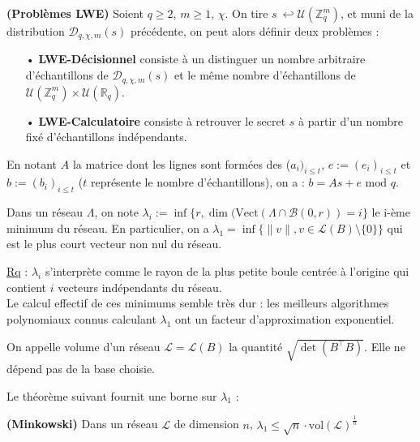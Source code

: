 \documentclass[11pt,a4paper]{article}
\begin{document}
\begin{defin}\textbf{(Problèmes LWE)}
Soient $q\geq 2$, $m\geq 1$, $\chi$. On tire $s\ \hookleftarrow \mathcal{U}( \mathbb{Z}_q^m)$, et muni de la distribution $\mathcal{D}_{q,\chi,m}(s)$ précédente, on peut alors définir deux problèmes : 
\begin{enumerate}
\item[•]\textbf{LWE-Décisionnel} consiste à un distinguer un nombre arbitraire d'échantillons de $\mathcal{D}_{q,\chi,m}(s)$ et le même nombre d'échantillons de $\mathcal{U}(\mathbb{Z}_q^m)\times\mathcal{U}(\mathbb{R}_q)$.
\item[•]\textbf{LWE-Calculatoire} consiste à retrouver le secret $s$ à partir d'un nombre fixé d'échantillons indépendants.
\end{enumerate}
\end{defin}

En notant $A$ la matrice dont les lignes sont formées des ($a_i)_{i\leq t}$, $e:=(e_i)_{i\leq t}$ et $b:=(b_i)_{i\leq t}$ ($t$ représente le nombre d'échantillons), on a : $b=As +e \text{ mod } q$.

\begin{defin}
Dans un réseau $\Lambda$, on note $\lambda_i := \inf\{r,\dim(\text{Vect}(\Lambda\cap\mathcal{B}(0,r))=i\}$ le i-ème minimum du réseau. En particulier, on a $\lambda_1 = \inf\{\|v\| ,  v \in \mathcal{L}(B)\setminus\{0\}\}$ qui est le plus court vecteur non nul du réseau.
\end{defin}

\underline{Rq} : $\lambda_i$ s'interprète comme le rayon de la plus petite boule centrée à l'origine qui contient $i$ vecteurs indépendants du réseau. \\ Le calcul effectif de ces minimums semble très dur : les meilleurs algorithmes polynomiaux connus calculant $\lambda_1$ ont un facteur d'approximation exponentiel. \\

\begin{defin}
 On appelle volume d'un réseau $\mathcal{L}=\mathcal{L}(B)$ la quantité $\sqrt{\det{(B^\top B)}}$. Elle ne dépend pas de la base choisie.
\end{defin}

Le théorème suivant fournit une borne sur $\lambda_1$ :
\begin{theorem}\textbf{(Minkowski)}
Dans un réseau $\mathcal{L}$ de dimension $n$, $\lambda_1 \leq \sqrt{n}\cdot\text{vol}(\mathcal{L})^\frac{1}{n}$
\end{theorem}
\end{document}
